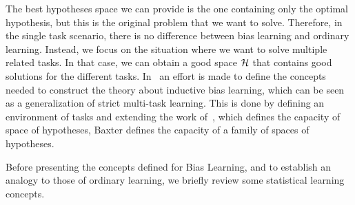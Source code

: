 The best hypotheses space we can provide is the one containing only the optimal hypothesis, but this is the original problem that we want to solve. Therefore, in the single task scenario, there is no difference between bias learning and ordinary learning.
Instead, we focus on the situation where we want to solve multiple related tasks. In that case, we can obtain a good space $\mathcal{H}$ that contains good solutions for the different tasks.
%
In~\cite{baxter2000model} an effort is made to define the concepts needed to construct the theory about inductive bias learning, which can be seen as a generalization of strict multi-task learning. This is done by defining an environment of tasks and extending the work of~\cite{vapnik2013nature}, which defines the capacity of space of hypotheses, Baxter defines the capacity of a family of spaces of hypotheses.

Before presenting the concepts defined for Bias Learning, and to establish an analogy to those of ordinary learning, we briefly review some statistical learning concepts.
